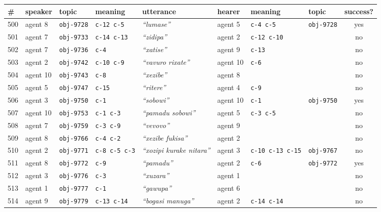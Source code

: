
\renewcommand{\arraystretch}{1.3}{
\begin{tabular}{@{}llllllllc@{}}
  \# & speaker & topic & meaning & utterance & hearer & meaning & topic & success? \\
  \hline
500 & agent 8 & \texttt{obj-9728} & \texttt{c-12 c-5} & \textit{``lumase''} & agent 5 & \texttt{c-4 c-5} & \texttt{obj-9728} & yes \\
501 & agent 7 & \texttt{obj-9733} & \texttt{c-14 c-13} & \textit{``zidipa''} & agent 2 & \texttt{c-12 c-10} & \texttt{} & no \\
502 & agent 7 & \texttt{obj-9736} & \texttt{c-4} & \textit{``xatise''} & agent 9 & \texttt{c-13} & \texttt{} & no \\
503 & agent 2 & \texttt{obj-9742} & \texttt{c-10 c-9} & \textit{``vavuro rixate''} & agent 10 & \texttt{c-6} & \texttt{} & no \\
504 & agent 10 & \texttt{obj-9743} & \texttt{c-8} & \textit{``xezibe''} & agent 8 & \texttt{} & \texttt{} & no \\
505 & agent 5 & \texttt{obj-9747} & \texttt{c-15} & \textit{``ritere''} & agent 4 & \texttt{c-9} & \texttt{} & no \\
506 & agent 3 & \texttt{obj-9750} & \texttt{c-1} & \textit{``sobowi''} & agent 10 & \texttt{c-1} & \texttt{obj-9750} & yes \\
507 & agent 10 & \texttt{obj-9753} & \texttt{c-1 c-3} & \textit{``pamadu sobowi''} & agent 5 & \texttt{c-3 c-5} & \texttt{} & no \\
508 & agent 7 & \texttt{obj-9759} & \texttt{c-3 c-9} & \textit{``vevovo''} & agent 9 & \texttt{} & \texttt{} & no \\
509 & agent 8 & \texttt{obj-9766} & \texttt{c-4 c-2} & \textit{``xezibe fukisa''} & agent 2 & \texttt{} & \texttt{} & no \\
510 & agent 2 & \texttt{obj-9771} & \texttt{c-8 c-5 c-3} & \textit{``xozipi kurake nitara''} & agent 3 & \texttt{c-10 c-13 c-15} & \texttt{obj-9767} & no \\
511 & agent 8 & \texttt{obj-9772} & \texttt{c-9} & \textit{``pamadu''} & agent 2 & \texttt{c-6} & \texttt{obj-9772} & yes \\
512 & agent 3 & \texttt{obj-9776} & \texttt{c-3} & \textit{``xuzara''} & agent 1 & \texttt{} & \texttt{} & no \\
513 & agent 1 & \texttt{obj-9777} & \texttt{c-1} & \textit{``gawupa''} & agent 6 & \texttt{} & \texttt{} & no \\
514 & agent 9 & \texttt{obj-9779} & \texttt{c-13 c-14} & \textit{``bogasi manuga''} & agent 2 & \texttt{c-14 c-14} & \texttt{} & no \\

\end{tabular}}
